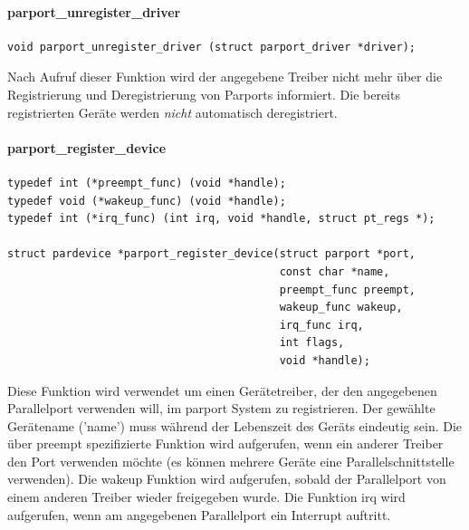 \documentclass[a4paper,11pt]{article}
\begin{document}
\paragraph{parport\_unregister\_driver}

\begin{verbatim}
void parport_unregister_driver (struct parport_driver *driver);
\end{verbatim}

Nach Aufruf dieser Funktion wird der angegebene Treiber nicht mehr über die Registrierung
und Deregistrierung von Parports informiert. Die bereits registrierten Geräte werden \emph{nicht}
automatisch deregistriert.


\paragraph{parport\_register\_device}

\begin{verbatim}
typedef int (*preempt_func) (void *handle);
typedef void (*wakeup_func) (void *handle);
typedef int (*irq_func) (int irq, void *handle, struct pt_regs *);

struct pardevice *parport_register_device(struct parport *port,
                                          const char *name,
                                          preempt_func preempt,
                                          wakeup_func wakeup,
                                          irq_func irq,
                                          int flags,
                                          void *handle);
\end{verbatim}

Diese Funktion wird verwendet um einen Gerätetreiber, der den angegebenen Parallelport verwenden will,
im parport System zu registrieren. Der gewählte Gerätename ('name') muss während der Lebenszeit des
Geräts eindeutig sein. 
Die über preempt spezifizierte Funktion wird aufgerufen, wenn ein anderer Treiber den Port verwenden
möchte (es können mehrere Geräte eine Parallelschnittstelle verwenden).
Die wakeup Funktion wird aufgerufen, sobald der Parallelport von einem anderen Treiber wieder
freigegeben wurde. Die Funktion irq wird aufgerufen, wenn am angegebenen Parallelport ein Interrupt
auftritt.
\end{document}
